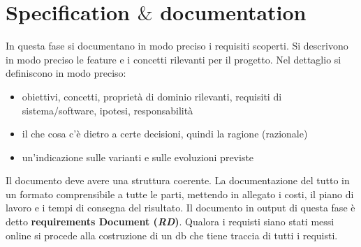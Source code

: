 \section{Specification $\&$ documentation}
In questa fase si documentano in modo preciso i requisiti scoperti. Si descrivono in modo preciso le feature e i concetti rilevanti per il progetto. Nel dettaglio si definiscono in modo preciso:
\begin{itemize}
  \item obiettivi, concetti, proprietà di dominio rilevanti, requisiti di sistema/software, ipotesi, responsabilità 
  \item il che cosa c'è dietro a certe decisioni, quindi la ragione (razionale)
  \item un'indicazione sulle varianti e sulle evoluzioni previste
\end{itemize}
Il documento deve avere una struttura coerente. La documentazione del tutto in un formato comprensibile a tutte le parti, mettendo in allegato i costi, il piano di lavoro e i tempi di consegna del risultato. Il documento in output di questa fase  è detto \textbf{requirements Document (\textit{RD})}. Qualora i requisti siano stati messi online si procede alla costruzione di un db che tiene traccia di tutti i requisti. 

